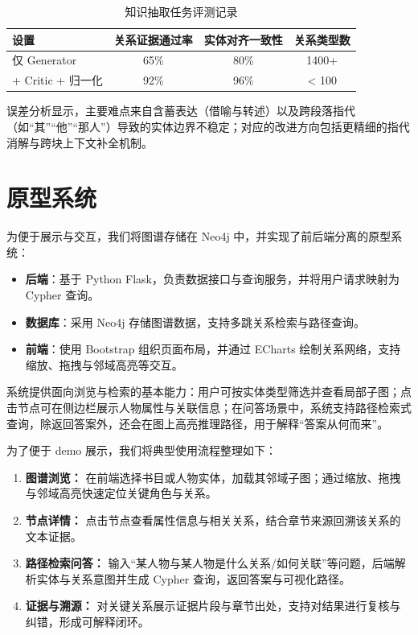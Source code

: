\documentclass[lang=cn,a4paper,newtx,code=minted]{elegantpaper}
\begin{document}
\begin{table}[htbp]
    \centering
    \caption{知识抽取任务评测记录}
    \label{tab:ie_eval}
    \begin{tabular}{lccc}
        \hline
        \textbf{设置} & \textbf{关系证据通过率} & \textbf{实体对齐一致性} & \textbf{关系类型数} \\
        \hline
        仅 Generator & 65\% & 80\% & 1400+ \\
        + Critic + 归一化 & 92\% & 96\% & < 100 \\
        \hline
    \end{tabular}
\end{table}

误差分析显示，主要难点来自含蓄表达（借喻与转述）以及跨段落指代（如“其”“他”“那人”）导致的实体边界不稳定；对应的改进方向包括更精细的指代消解与跨块上下文补全机制。

\section{原型系统}

为便于展示与交互，我们将图谱存储在 Neo4j 中，并实现了前后端分离的原型系统：
\begin{itemize}
    \item \textbf{后端}：基于 Python Flask，负责数据接口与查询服务，并将用户请求映射为 Cypher 查询。
    \item \textbf{数据库}：采用 Neo4j 存储图谱数据，支持多跳关系检索与路径查询。
    \item \textbf{前端}：使用 Bootstrap 组织页面布局，并通过 ECharts 绘制关系网络，支持缩放、拖拽与邻域高亮等交互。
\end{itemize}

系统提供面向浏览与检索的基本能力：用户可按实体类型筛选并查看局部子图；点击节点可在侧边栏展示人物属性与关联信息；在问答场景中，系统支持路径检索式查询，除返回答案外，还会在图上高亮推理路径，用于解释“答案从何而来”。

为了便于 demo 展示，我们将典型使用流程整理如下：
\begin{enumerate}
    \item \textbf{图谱浏览：} 在前端选择书目或人物实体，加载其邻域子图；通过缩放、拖拽与邻域高亮快速定位关键角色与关系。
    \item \textbf{节点详情：} 点击节点查看属性信息与相关关系，结合章节来源回溯该关系的文本证据。
    \item \textbf{路径检索问答：} 输入“某人物与某人物是什么关系/如何关联”等问题，后端解析实体与关系意图并生成 Cypher 查询，返回答案与可视化路径。
    \item \textbf{证据与溯源：} 对关键关系展示证据片段与章节出处，支持对结果进行复核与纠错，形成可解释闭环。
\end{enumerate}
\end{document}
